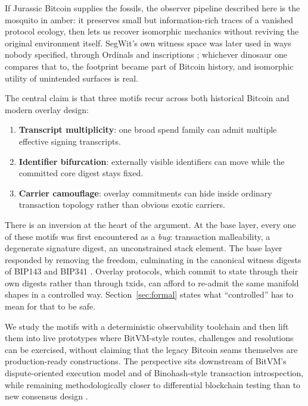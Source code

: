 \documentclass[11pt]{article}
\begin{document}
If Jurassic Bitcoin supplies the fossils, the observer pipeline described here
is the mosquito in amber: it preserves small but information-rich traces of a
vanished protocol ecology, then lets us recover isomorphic mechanics without
reviving the original environment itself. SegWit's own witness space was later
used in ways nobody specified, through Ordinals and inscriptions
\cite{rodarmor2023ordinals}; whichever dinosaur one compares that to, the
footprint became part of Bitcoin history, and isomorphic utility of unintended
surfaces is real.

The central claim is that three motifs recur across both historical Bitcoin
and modern overlay design:

\begin{enumerate}
\item \textbf{Transcript multiplicity}: one broad spend family can admit
multiple effective signing transcripts.
\item \textbf{Identifier bifurcation}: externally visible identifiers can move
while the committed core digest stays fixed.
\item \textbf{Carrier camouflage}: overlay commitments can hide inside ordinary
transaction topology rather than obvious exotic carriers.
\end{enumerate}

There is an inversion at the heart of the argument. At the base layer, every
one of these motifs was first encountered as a \emph{bug}: transaction
malleability, a degenerate signature digest, an unconstrained stack element.
The base layer responded by removing the freedom, culminating in the canonical
witness digests of BIP143 and BIP341
\cite{bip62,bip66,bip143,bip147,bip341,bip342}. Overlay protocols, which commit
to state through their own digests rather than through txids, can afford to
re-admit the same manifold shapes in a controlled way. Section~\ref{sec:formal}
states what ``controlled'' has to mean for that to be safe.

We study the motifs with a deterministic observability toolchain and then lift
them into live prototypes where BitVM-style routes, challenges and resolutions
can be exercised, without claiming that the legacy Bitcoin seams themselves are
production-ready constructions. The perspective sits downstream of BitVM's
dispute-oriented execution model and of Binohash-style transaction
introspection, while remaining methodologically closer to differential
blockchain testing than to new consensus design
\cite{linus2023bitvm,linus2025bitvm2,linus2026binohash,yang2021fluffy,kim2025fork}.
\end{document}
